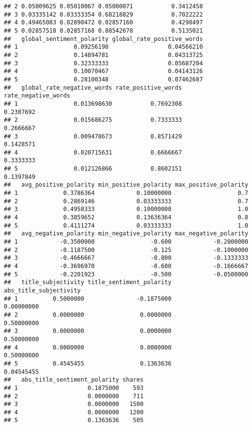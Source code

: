 \documentclass[]{article}
\begin{document}
\begin{verbatim}
## 2 0.05009625 0.05010067 0.05000071           0.3412458
## 3 0.03335142 0.03333354 0.68218829           0.7022222
## 4 0.49465083 0.02890472 0.02857160           0.4298497
## 5 0.02857518 0.02857168 0.88542678           0.5135021
##   global_sentiment_polarity global_rate_positive_words
## 1                0.09256198                 0.04566210
## 2                0.14894781                 0.04313725
## 3                0.32333333                 0.05687204
## 4                0.10070467                 0.04143126
## 5                0.28100348                 0.07462687
##   global_rate_negative_words rate_positive_words rate_negative_words
## 1                0.013698630           0.7692308           0.2307692
## 2                0.015686275           0.7333333           0.2666667
## 3                0.009478673           0.8571429           0.1428571
## 4                0.020715631           0.6666667           0.3333333
## 5                0.012126866           0.8602151           0.1397849
##   avg_positive_polarity min_positive_polarity max_positive_polarity
## 1             0.3786364            0.10000000                   0.7
## 2             0.2869146            0.03333333                   0.7
## 3             0.4958333            0.10000000                   1.0
## 4             0.3859652            0.13636364                   0.8
## 5             0.4111274            0.03333333                   1.0
##   avg_negative_polarity min_negative_polarity max_negative_polarity
## 1            -0.3500000                -0.600            -0.2000000
## 2            -0.1187500                -0.125            -0.1000000
## 3            -0.4666667                -0.800            -0.1333333
## 4            -0.3696970                -0.600            -0.1666667
## 5            -0.2201923                -0.500            -0.0500000
##   title_subjectivity title_sentiment_polarity abs_title_subjectivity
## 1          0.5000000               -0.1875000             0.00000000
## 2          0.0000000                0.0000000             0.50000000
## 3          0.0000000                0.0000000             0.50000000
## 4          0.0000000                0.0000000             0.50000000
## 5          0.4545455                0.1363636             0.04545455
##   abs_title_sentiment_polarity shares
## 1                    0.1875000    593
## 2                    0.0000000    711
## 3                    0.0000000   1500
## 4                    0.0000000   1200
## 5                    0.1363636    505
\end{verbatim}
\end{document}
